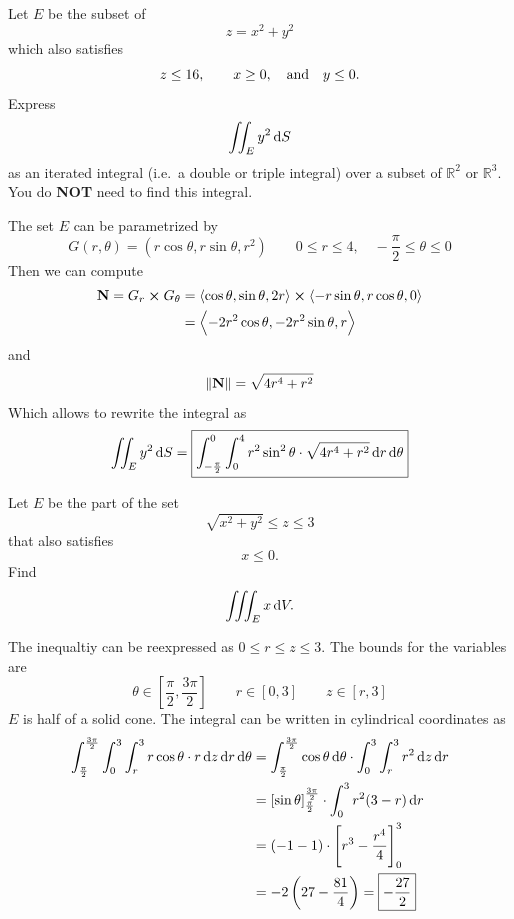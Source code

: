 \documentclass[12pt,answers]{exam}
\newcommand{\vect}[1]{\left\langle #1 \right\rangle}
\newcommand{\RR}{\mathbb{R}}
\begin{document}
\begin{questions}
	\newpage
	\question
	Let $E$ be the subset of
	\[
		z = x^2 + y^2
	\]
	which also satisfies 
	\[
		z \le 16, \qquad x \ge 0, \qand y \le 0.
	\]
	Express
	\[
		\iint_E y^2 \dif S
	\]
	as an iterated integral (i.e.~a double or triple integral) over a subset of $\RR^2$ or $\RR^3$. You do \textbf{NOT} need to find this integral.
	\begin{solution}
		The set $E$ can be parametrized by 
		\[
			G(r, \theta) = (r \cos \theta, r\sin\theta, r^2) 
			\qquad 0 \le r \le 4, 
			\quad -\frac\pi2\le \theta \le 0
		\]
		Then we can compute
		\begin{align*}
			\vb{N} = G_r \cross G_\theta 
			&= \vect{\cos \theta, \sin\theta, 2r} \cross \vect{-r\sin\theta, r\cos\theta, 0}  \\ 
			&= \vect{-2r^2\cos\theta, -2r^2\sin\theta, r}
		\end{align*}
		and
		\[
			\|\vb{N}\| = \sqrt{4r^4+r^2}
		\]
		Which allows to rewrite the integral as
		\[
			\iint_E y^2 \dif S 
			= \boxed{\int_{-\frac\pi2}^0 \int_0^4 r^2 \sin^2\theta \cdot \sqrt{4r^4+r^2} \dif r \dif \theta}
		\]
		
	\end{solution}

	\newpage
	\question
	Let $E$ be the part of the set
	\[
		\sqrt{x^2+y^2} \le z \le 3
	\]
	that also satisfies
	\[
		x \le 0.
	\]
	Find 
	\[
		\iiint_{E} x \dif V.
	\]
	\begin{solution}
		The inequaltiy can be reexpressed as 
		$0 \le r \le z \le 3$. 
		The bounds for the variables are
		\[
			\theta \in [\frac\pi2, \frac{3\pi}{2}] 
			\qquad 
			r \in [0,3]
			\qquad
			z \in [r,3]
		\]
		$E$ is half of a solid cone.
		The integral can be written in cylindrical coordinates as
		\begin{align*}
			\int_{\frac\pi2}^{\frac{3\pi}{2}} \int_0^3 \int_r^3 r \cos \theta \cdot r \dif z \dif r \dif \theta
			&= \int_{\frac\pi2}^{\frac{3\pi}{2}} \cos\theta \dif \theta \cdot \int_0^3 \int_r^3 r^2 \dif z \dif r \\
			&= \left[ \sin\theta\right]_{\frac\pi2}^{\frac{3\pi}{2}} 
			\cdot \int_0^3 r^2 (3-r) \dif r \\
			&= (-1-1) \cdot \left[r^3 - \frac{r^4}{4}\right]_0^3 \\
			&= -2\left(27 - \frac{81}{4}\right)
			= \boxed{-\frac{27}{2}}
		\end{align*}
	\end{solution}

\end{questions}
\end{document}

